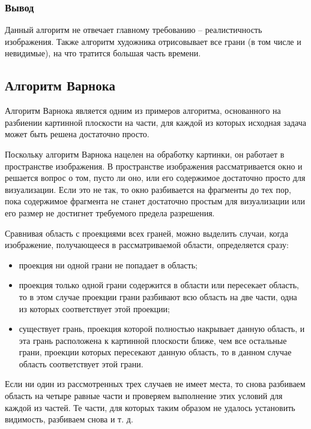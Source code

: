 \subsubsection*{Вывод}
Данный алгоритм не отвечает главному требованию – реалистичность изображения. Также алгоритм художника отрисовывает все грани (в том числе и невидимые), на что тратится большая часть времени.


\subsection{Алгоритм Варнока}

 Алгоритм Варнока \cite{varnok} является одним из примеров алгоритма, основанного на разбиении картинной плоскости на части, для каждой из которых исходная задача может быть решена достаточно просто.
 
 Поскольку алгоритм Варнока нацелен на обработку картинки, он работает в пространстве изображения. В пространстве изображения рассматривается окно и решается вопрос о том, пусто ли оно, или его содержимое достаточно просто для визуализации. Если это не так, то окно разбивается на фрагменты до тех пор, пока содержимое фрагмента не станет достаточно простым для визуализации или его размер не достигнет требуемого предела разрешения.
 
 Сравнивая область с проекциями всех граней, можно выделить случаи, когда изображение, получающееся в рассматриваемой области, определяется сразу:
 
\begin{itemize}
 \item	проекция ни одной грани не попадает в область;
\item	проекция только одной грани содержится в области или пересекает область, то в этом случае проекции грани разбивают всю область на две части, одна из которых соответствует этой проекции;
\item	существует грань, проекция которой полностью накрывает данную область, и эта грань расположена к картинной плоскости ближе, чем все остальные грани, проекции которых пересекают данную область, то в данном случае область соответствует этой грани.
\end{itemize}
 
 Если ни один из рассмотренных трех случаев не имеет места, то снова разбиваем область на четыре равные части и проверяем выполнение этих условий для каждой из частей. Те части, для которых таким образом не удалось установить видимость, разбиваем снова и т. д.
 
